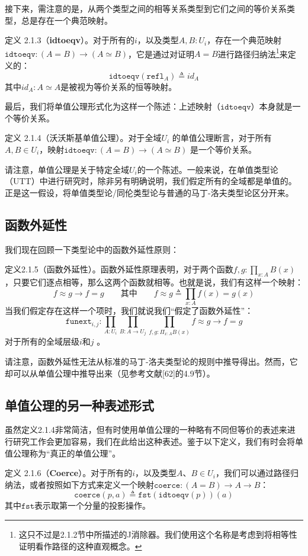 \documentclass{ctexrep}
\theoremstyle{plain}
\theoremstyle{definition}
\theoremstyle{remark}
\begin{document}
接下来，需注意的是，从两个类型之间的相等关系类型到它们之间的等价关系类型，总是存在一个典范映射。 

定义 2.1.3（\textbf{idtoeqv}）。对于所有的\(i\)，以及类型\(A,B: U_{i}\)，存在一个典范映射\(\mathtt{idtoeqv}: (A = B) \to (A \simeq B)\)，它是通过对证明\(A = B\)进行路径归纳法\footnote{这只不过是2.1.2节中所描述的J消除器。我们使用这个名称是考虑到将相等性证明看作路径的这种直观概念。 }来定义的：
\[\mathtt{idtoeqv} \left(\mathtt{refl}_{A}\right) \triangleq id_{A}\]
其中\(id_{A}: A \simeq A\)是被视为等价关系的恒等映射。

最后，我们将单值公理形式化为这样一个陈述：上述映射（\(\mathtt{idtoeqv}\)）本身就是一个等价关系。 

定义 2.1.4（沃沃斯基单值公理）。对于全域\(U_{i}\) 的单值公理断言，对于所有\(A, B \in U_{i}\)，映射\(\mathtt{idtoeqv}: (A = B) \to (A \simeq B)\) 是一个等价关系。 

请注意，单值公理是关于特定全域\(U_{i}\)的一个陈述。一般来说，在单值类型论（UTT）中进行研究时，除非另有明确说明，我们假定所有的全域都是单值的。正是这一假设，将单值类型论/同伦类型论与普通的马丁-洛夫类型论区分开来。 

\subsection{函数外延性}
我们现在回顾一下类型论中的函数外延性原则： 

定义2.1.5（函数外延性）。函数外延性原理表明，对于两个函数\(f, g: \prod_{x: A} B(x)\)，只要它们逐点相等，那么这两个函数就相等。也就是说，我们有这样一个映射：
\[f \approx g \to f = g\qquad\text{其中}\qquad f \approx g \triangleq \prod_{x: A} f(x) = g(x)\]
当我们假定存在这样一个项时，我们就说我们“假定了函数外延性”：
\[\mathtt{funext}_{i, j}: \prod_{A: U_{i}} \prod_{B: A \to U_{j}} \prod_{f, g: \Pi_{x: A} B(x)} f \approx g \to f=g\]
对于所有的全域层级\(i\)和\(j\) 。 

请注意，函数外延性无法从标准的马丁-洛夫类型论的规则中推导得出。然而，它却可以从单值公理中推导出来（见参考文献[62]的4.9节）。 

\subsection{单值公理的另一种表述形式}

虽然定义2.1.4非常简洁，但有时使用单值公理的一种略有不同但等价的表述来进行研究工作会更加容易，我们在此给出这种表述。鉴于以下定义，我们有时会将单值公理称为“真正的单值公理”。 

定义 2.1.6（\textbf{Coerce}）。对于所有的\(i\)，以及类型\(A\)、\(B \in U_{i}\)，我们可以通过路径归纳法，或者按照如下方式来定义一个映射\(\mathtt{coerce} : (A = B) \to A \to B\)：
\[\mathtt{coerce}(p, a) \triangleq \mathtt{fst}(\mathtt{idtoeqv}(p))(a)\]
其中\(\mathtt{fst}\)表示取第一个分量的投影操作。 
\end{document}
